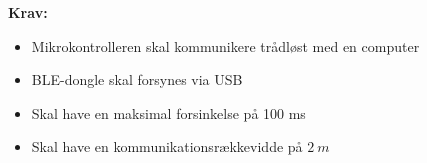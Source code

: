 \textbf{Krav:}
\begin{itemize}
\item Mikrokontrolleren skal kommunikere trådløst med en computer
\item BLE-dongle skal forsynes via USB
\item Skal have en maksimal forsinkelse på 100 ms 
\item Skal have en kommunikationsrækkevidde på $2~m$
\end{itemize}
